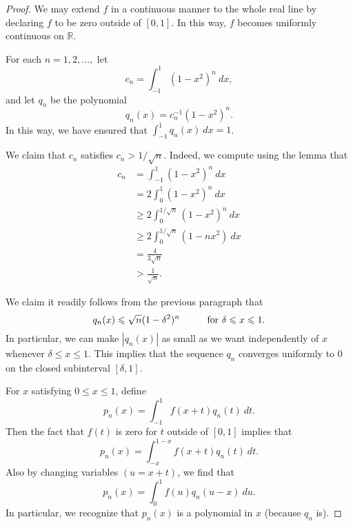 \documentclass[12pt]{article}
\theoremstyle{definition}
\theoremstyle{theorem}
\begin{document}
\begin{proof}
We may extend $f$ in a continuous manner to the whole real line by declaring $f$ to be zero outside of $[0,1]$. In this way, $f$ becomes uniformly continuous on $\mathbb{R}$. 

For each $n = 1, 2, \ldots,$ let 
\[
c_n = \int_{-1}^1 (1-x^2)^n \: dx,
\]
and let $q_n$ be the polynomial 
\[
q_n(x) = c_n^{-1} (1-x^2)^n.
\]
In this way, we have ensured that $\int_{-1}^1 q_n(x) \: dx = 1$. 

We claim that $c_n$ satisfies $c_n > 1/\sqrt{n}$. Indeed, we compute using the lemma that 
\begin{align*}
c_n &= \int_{-1}^1 (1-x^2)^n \: dx \\
&= 2\int_0^1 (1-x^2)^n \: dx \\
&\geqslant 2\int_0^{1/\sqrt{n}}(1-x^2)^n \: dx \\
&\geqslant 2\int_0^{1/\sqrt{n}} (1 - nx^2) \: dx  \\
&= \frac{4}{3 \sqrt{n}} \\
&> \frac{1}{\sqrt{n}}.
\end{align*}

We claim it readily follows from the previous paragraph that   
\[
q_n(x) \leqslant \sqrt{n}(1-\delta^2)^n \hspace{10mm} \text{for $\delta \leqslant x \leqslant 1$}.
\]
In particular, we can make $|q_n(x)|$ as small as we want independently of $x$ whenever $\delta \leqslant x \leqslant 1$. This implies that the sequence $q_n$ converges uniformly to $0$ on the closed subinterval $[\delta, 1]$. 

For $x$ satisfying $0 \leqslant x \leqslant 1$, define 
\[
p_n(x) = \int_{-1}^1 f(x + t) q_n(t) \: dt. 
\]
Then the fact that $f(t)$ is zero for $t$ outside of $[0,1]$ implies that 
\[
p_n(x) = \int_{-x}^{1-x} f(x + t) q_n(t) \: dt.
\]
Also by changing variables $(u = x + t)$, we find that 
\[
p_n(x) = \int_{0}^{1} f(u) q_n(u-x) \: du.
\]
In particular, we recognize that $p_n(x)$ is a polynomial in $x$ (because $q_n$ is). 


\end{proof}
\end{document}
